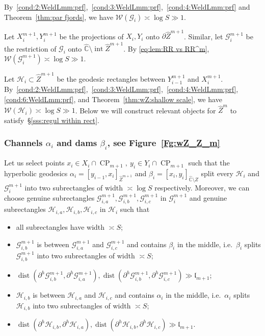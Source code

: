 \documentclass{amsart}
\newcommand{\1}{{\mathbb 1 }}
\newcommand{\FamG}{{\mathcal G}}
\newcommand{\FamH}{{\mathcal H}}
\newcommand{\Width}{{\mathcal W}}
\newcommand\intr{\operatorname{int}}
\newcommand{\wZ}{{\widehat Z}}
\newcommand{\length}{{\mathfrak l}}
\newcommand{\wC}{\widehat{\mathbb{C}}}
\theoremstyle{remark}
\numberwithin{equation}{section}
\theoremstyle{definition}
\newcommand{\dist}{\operatorname{dist}}
\newcommand{\CP}{{\operatorname{CP}}}
\begin{document}
 By~\ref{cond:2:WeldLmm:prf},~\ref{cond:3:WeldLmm:prf},~\ref{cond:4:WeldLmm:prf} and Theorem~\ref{thm:par fjords}, we have $\Width(\FamG_i)\asymp \log S\gg 1$.
 
 
 Let $X_i^{m+1},Y^{m+1}_i$ be the projections of $X_i,Y_i$ onto $\partial \wZ^{m+1}$. Similar, let $\FamG_i^{m+1}$ be the restriction of $\FamG_i$ onto $\wC\setminus \intr \wZ^{m+1}$. By \eqref{eq:lem:RR vs RR^m}, $\Width(\FamG^{m+1}_i)\asymp \log S \gg 1$.
  

Let $\FamH_i\subset \wZ^{m+1}$ be the geodesic rectangles between $Y^{m+1}_{i-1}$ and $X^{m+1}_{i}$. By~\ref{cond:2:WeldLmm:prf},~\ref{cond:3:WeldLmm:prf},~\ref{cond:4:WeldLmm:prf}, \ref{cond:6:WeldLmm:prf}, and Theorem~\ref{thm:wZ:shallow scale}, we have $\Width(\FamH_i)\asymp \log S\gg1$. Below we will construct relevant objects for $\wZ^m$ to satisfy~\S\ref{sss:regul within rect}.  

\subsubsection{Channels $\alpha_i$ and dams $\beta_i$, see Figure~\ref{Fg:wZ_Z_m}} Let us select points $x_i\in X_i \cap \CP_{m+1}, \ y_i\in Y_{i}\cap \CP_{m+1}$ such that the hyperbolic geodesics $\alpha_i=[y_{i-1},x_{i}]_{\wZ^{m+1}}$ and $\beta_i=[x_i, y_i]_{\wC\setminus Z}$ split every $\FamH_i$ and $\FamG_i^{m+1}$ into two subrectangles of width $\asymp \log S$ respectively. Moreover, we can choose genuine subrectangles $\FamG^{m+1}_{i,a}, \FamG^{m+1}_{i,b}, \FamG^{m+1}_{i,c}$ in $\FamG^{m+1}_i$ and genuine subrectangles $\FamH_{i,a}, \FamH_{i,b}, \FamH_{i,c}$ in $\FamH_i$  such that
\begin{itemize}
\item all subrectangles have width $\asymp S$;
\item $\FamG^{m+1}_{i,b}$ is between $\FamG^{m+1}_{i,a}$ and $\FamG^{m+1}_{i,c}$ and contains $\beta_i$ in the middle, i.e.~$\beta_i$ splits $\FamG^{m+1}_{i,b}$ into two subrectangles of width $\asymp S$;
\item $\dist(\partial^h \FamG^{m+1}_{i,b}, \partial^h  \FamG^{m+1}_{i,a}), \dist(\partial^h \FamG^{m+1}_{i,b}, \partial^h \FamG^{m+1}_{i,c})\gg \length_{m+1}$;
\item $\FamH_{i,b}$ is between $\FamH_{i,a}$ and $\FamH_{i,c}$ and contains $\alpha_i$ in the middle, i.e.~$\alpha_i$ splits $\FamH_{i,b}$ into two subrectangles of width $\asymp S$;
\item $\dist(\partial^h \FamH_{i,b}, \partial^h \FamH_{i,a}), \dist(\partial^h \FamH_{i,b}, \partial^h \FamH_{i,c})\gg \length_{m+1}$.
\end{itemize}  
\end{document}
